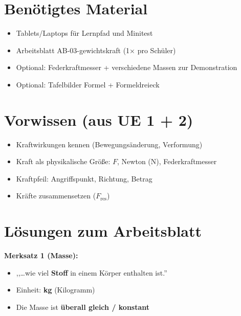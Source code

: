 \documentclass[a4paper,11pt]{article}
\begin{document}
\vspace{5mm}


\section*{Benötigtes Material}

\begin{itemize}[nosep]
    \item Tablets/Laptops für Lernpfad und Minitest
    \item Arbeitsblatt AB-03-gewichtskraft (1× pro Schüler)
    \item Optional: Federkraftmesser + verschiedene Massen zur Demonstration
    \item Optional: Tafelbilder Formel + Formeldreieck
\end{itemize}

\vspace{5mm}


\section*{Vorwissen (aus UE 1 + 2)}

\begin{itemize}[nosep]
    \item Kraftwirkungen kennen (Bewegungsänderung, Verformung)
    \item Kraft als physikalische Größe: $F$, Newton (N), Federkraftmesser
    \item Kraftpfeil: Angriffspunkt, Richtung, Betrag
    \item Kräfte zusammensetzen ($F_{\text{res}}$)
\end{itemize}

\vspace{5mm}


\section*{Lösungen zum Arbeitsblatt}

\textbf{Merksatz 1 (Masse):}
\begin{itemize}[nosep]
    \item ,,\ldots wie viel \textbf{Stoff} in einem Körper enthalten ist.''
    \item Einheit: \textbf{kg} (Kilogramm)
    \item Die Masse ist \textbf{überall gleich / konstant}
\end{itemize}
\end{document}
